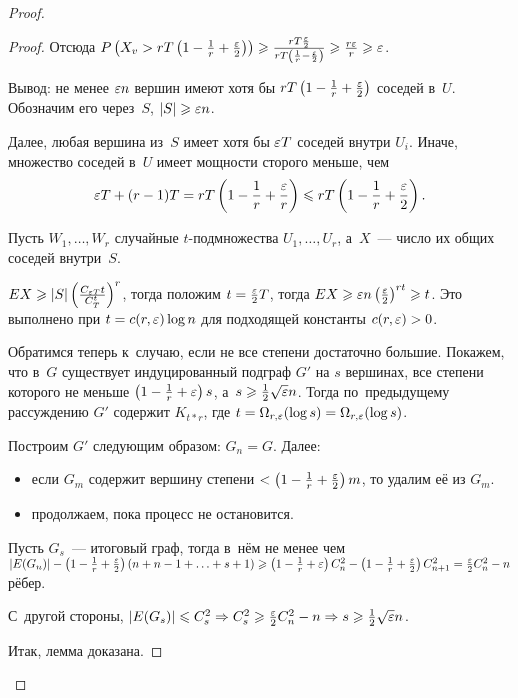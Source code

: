 \documentclass{article}
\begin{document}
\begin{proof}
\begin{proof}
		Отсюда $P\left(X_v > rT\left(1 - \frac{1}{r} + \frac{\varepsilon}{2}\right)\right)
		\geqslant \frac{rT \frac{\varepsilon}{2}}{rT \left(\frac{1}{r} - \frac{\varepsilon}{2}\right)}
		\geqslant \frac{r\varepsilon}{r} \geqslant \varepsilon$.

		Вывод: не менее $\varepsilon n$ вершин имеют хотя бы $rT\left(1 - \frac{1}{r} +
		\frac{\varepsilon}{2}\right)$ соседей в~$U$. Обозначим его через~$S$, $|S| \geqslant \varepsilon
		n$.

		Далее, любая вершина из~$S$ имеет хотя бы $\varepsilon T$ соседей внутри $U_i$.
		Иначе, множество соседей в~$U$ имеет мощности сторого меньше, чем
		$$ \varepsilon T + (r - 1) T = rT \left(1 - \frac{1}{r} + \frac{\varepsilon}{r}\right) \leqslant
		rT \left( 1 - \frac{1}{r} + \frac{\varepsilon}{2} \right).$$

		Пусть $W_1, \ldots, W_r$ случайные $t$-подмножества $U_1, \ldots, U_r$,
		а~$X$~--- число их общих соседей внутри~$S$.

		$ EX \geqslant |S| \left( \frac{C_{\varepsilon T}{t}}{C_T^t}\right)^r $, тогда положим $t =
		\frac{\varepsilon}{2}T$, тогда $EX \geqslant \varepsilon n \left(\frac{\varepsilon}{2}\right)^{rt} \geqslant
		t$. Это выполнено при $t = c(r, \varepsilon) \log n$ для подходящей константы $c(r,
		\varepsilon) > 0$.

		Обратимся теперь к~случаю, если не все степени достаточно большие. Покажем,
		что в~$G$ существует индуцированный подграф $G'$ на $s$ вершинах, все
		степени которого не меньше $\left(1 - \frac{1}{r} + \varepsilon\right)s$, а~$s \geqslant
		\frac{1}{2} \sqrt{\varepsilon} n$. Тогда по~предыдущему рассуждению $G'$ содержит
		$K_{t \ast r}$, где $t = \Omega_{r,\varepsilon}(\log s) = \Omega_{r,\varepsilon}(\log s)$.

		Построим $G'$ следующим образом: $G_n = G$. Далее:
		\begin{itemize}
			\item если $G_m$ содержит вершину степени $< \left( 1 - \frac{1}{r} +
				\frac{\varepsilon}{2}\right)m$, то удалим её из $G_m$.
			\item продолжаем, пока процесс не остановится.
		\end{itemize}

		Пусть $G_s$~--- итоговый граф, тогда в~нём не менее чем $|E(G_n)| -
		\left(1 - \frac{1}{r} + \frac{\varepsilon}{2}\right)(n + n - 1 + \ldots + s + 1)
		\geqslant \left(1 - \frac{1}{r} + \varepsilon\right) C_n^2 - \left( 1 - \frac{1}{r} +
		\frac{\varepsilon}{2}\right)C_{n+1}^2 = \frac{\varepsilon}{2} C_n^2 - n$ рёбер.

		С~другой стороны, $|E(G_s)| \leqslant C_s^2 \Rightarrow C_s^2 \geqslant
		\frac{\varepsilon}{2}C_n^2 - n \Rightarrow s \geqslant \frac{1}{2} \sqrt{\varepsilon} n$.

		Итак, лемма доказана.
	\end{proof}
\end{proof}
\end{document}
